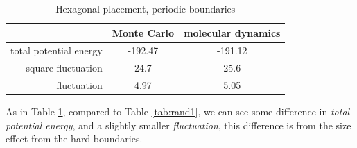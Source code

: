\documentclass[UTF8,a4paper,no-math]{article}
\begin{document}
\begin{table}[H]
	\centering
	\caption{Hexagonal placement, periodic boundaries}
	\begin{tabular}{rcc}
		\toprule
		\toprule
		                       & Monte Carlo & molecular dynamics \\ \midrule
		total potential energy & -192.47     & -191.12            \\
		square fluctuation     & 24.7        & 25.6               \\
		fluctuation            & 4.97        & 5.05               \\
		\bottomrule
	\end{tabular}%
	\label{tab:rand_hard1}%
\end{table}%
As in Table \ref{tab:rand_hard1}, compared to Table \ref{tab:rand1}, we can see some difference in \textit{total potential energy}, and a slightly smaller \textit{fluctuation},
this difference is from the size effect from the hard boundaries.
\end{document}
